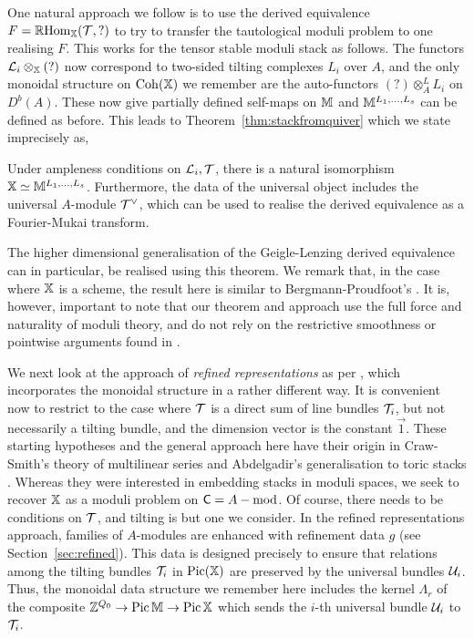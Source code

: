 \documentclass[12pt]{amsart}
\begin{document}
One natural approach we follow is to use the derived equivalence $F = \mathop{\mathbb{R}\mathrm{Hom}}\nolimits_{\mathbb{X}}(\mathcal{T},?)$ to try to transfer the tautological moduli problem to one realising $F$. This works for the tensor stable moduli stack as follows. The functors $\mathcal{L}_i \otimes_{\mathbb{X}}(?)$ now correspond to two-sided tilting complexes $L_i$ over $A$, and the only monoidal structure on $\operatorname{Coh}(\mathbb{X})$ we remember are the auto-functors $(?) \otimes^L_A L_i$ on $D^b(A)$. These now give partially defined self-maps on $\mathbb{M}$ and $\mathbb{M}^{L_1,\ldots,L_s}$ can be defined as before. This leads to Theorem~\ref{thm:stackfromquiver} which we state imprecisely as,
\begin{theorem}  \label{thm:2}
Under ampleness conditions on $\mathcal{L}_i, \mathcal{T}$, there is a natural isomorphism  $\mathbb{X} \simeq \mathbb{M}^{L_1,\ldots,L_s}$. Furthermore, the data of the universal object includes the universal $A$-module $\mathcal{T}^{\vee}$, which can be used to realise the derived equivalence as a Fourier-Mukai transform. 
\end{theorem}
The higher dimensional generalisation \cite{HIMO} of the Geigle-Lenzing derived equivalence can in particular, be realised using this theorem. 
We remark that, in the case where $\mathbb{X}$ is a scheme, the result here is similar to Bergmann-Proudfoot's \cite{MR2421120}. It is, however, important to note that our theorem and approach use the full force and naturality of moduli theory, and do not rely on the restrictive smoothness or pointwise arguments found in \cite{MR2421120}.

We next look at the approach of {\em refined representations} as per \cite{AU}, which incorporates the monoidal structure in a rather different way. It is convenient now to restrict to the case where $\mathcal{T}$ is a direct sum of line bundles $\mathcal{T}_i$, but not necessarily a tilting bundle, and the dimension vector is the constant $\vec{1}$. These starting hypotheses and the general approach here have their origin in Craw-Smith's \cite{Craw-Smith} theory of multilinear series and Abdelgadir's generalisation to toric stacks \cite{Abd}. Whereas they were interested in embedding stacks in moduli spaces, we seek to recover $\mathbb{X}$ as a moduli problem on ${\sf C} = A-\text{mod}$. Of course, there needs to be conditions on $\mathcal{T}$, and tilting is but one we consider.
In the refined representations approach, families of $A$-modules are enhanced with refinement data $g$ (see Section~\ref{sec:refined}). 
This data is designed precisely to ensure that relations among the tilting bundles $\mathcal{T}_i$ in $\operatorname{Pic}(\mathbb{X})$ are preserved by the universal bundles $\mathcal{U}_i$.
Thus, the monoidal data structure we remember here includes the kernel $\Lambda_r$ of the composite $\mathbb{Z}^{Q_0} \to \operatorname{Pic} \mathbb{M} \to \operatorname{Pic} \mathbb{X}$ which sends the $i$-th universal bundle $\mathcal{U}_i$ to $\mathcal{T}_i$.
\end{document}
